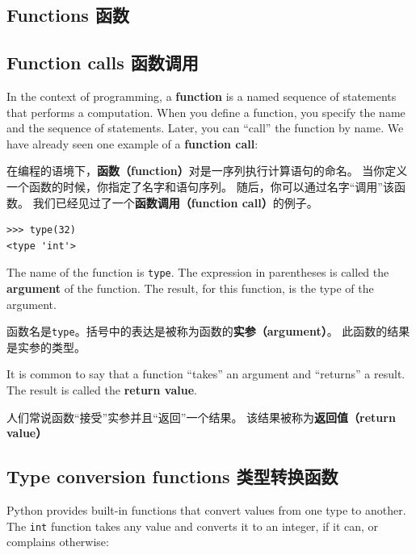 \documentclass[10pt]{book}
\begin{document}
\begin{CJK}{UTF8}{gbsn}
\chapter{Functions 函数}
\label{funcchap}

\section{Function calls 函数调用}
\label{functionchap}

In the context of programming, a {\bf function} is a named sequence of
statements that performs a computation.  When you define a function,
you specify the name and the sequence of statements.  Later, you can
``call'' the function by name.  
We have already seen one example of a {\bf function call}:

在编程的语境下，{\bf 函数（function）}对是一序列执行计算语句的命名。
当你定义一个函数的时候，你指定了名字和语句序列。
随后，你可以通过名字``调用''该函数。
我们已经见过了一个{\bf 函数调用（function call）}的例子。

\begin{verbatim}
>>> type(32)
<type 'int'>
\end{verbatim}
%
The name of the function is {\tt type}.  The expression in parentheses
is called the {\bf argument} of the function.  The result, for this
function, is the type of the argument.

函数名是{\tt type}。括号中的表达是被称为函数的{\bf 实参（argument）}。
此函数的结果是实参的类型。

It is common to say that a function ``takes'' an argument and ``returns''
a result.  The result is called the {\bf return value}.

人们常说函数``接受''实参并且``返回''一个结果。
该结果被称为{\bf 返回值（return value）}


\section{Type conversion functions 类型转换函数}



Python provides built-in functions that convert values
from one type to another.  The {\tt int} function takes any value and
converts it to an integer, if it can, or complains otherwise:


\end{CJK}
\end{document}
